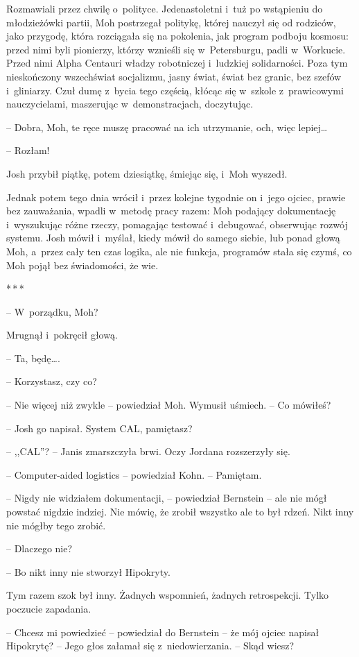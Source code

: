 \documentclass[oneside,polish,11pt,sfheadings]{mwbk}
\newcommand{\threeast}{\bigskip\par\centerline{*\,*\,*}\medskip\par}%
\begin{document}
Rozmawiali przez chwilę o~polityce. Jedenastoletni i~tuż po wstąpieniu do
młodzieżówki partii, Moh postrzegał politykę, której nauczył się od
rodziców, jako przygodę, która rozciągała się na pokolenia, jak program
podboju kosmosu: przed nimi byli pionierzy, którzy wznieśli się w~Petersburgu, padli w~Workucie. Przed nimi Alpha Centauri władzy
robotniczej i~ludzkiej solidarności. Poza tym nieskończony wszechświat
socjalizmu, jasny świat, świat bez granic, bez szefów i~gliniarzy. Czuł
dumę z~bycia tego częścią, kłócąc się w~szkole z~prawicowymi
nauczycielami, maszerując w~demonstracjach, doczytując.

-- Dobra, Moh, te ręce muszę pracować na ich utrzymanie, och, więc
lepiej\ldots

-- Rozłam!

Josh przybił piątkę, potem dziesiątkę, śmiejąc się, i~Moh wyszedł.

Jednak potem tego dnia wrócił i~przez kolejne tygodnie on i~jego ojciec,
prawie bez zauważania, wpadli w~metodę pracy razem: Moh podający
dokumentację i~wyszukując różne rzeczy, pomagając testować i~debugować,
obserwując rozwój systemu. Josh mówił i~myślał, kiedy mówił do samego
siebie, lub ponad głową Moh, a~przez cały ten czas logika, ale nie
funkcja, programów stała się czymś, co Moh pojął bez świadomości, że
wie.
  \threeast 

-- W~porządku, Moh?

Mrugnął i~pokręcił głową. 

-- Ta, będę\ldots.

-- Korzystasz, czy co?

-- Nie więcej niż zwykle -- powiedział Moh. Wymusił uśmiech. -- Co mówiłeś?

-- Josh go napisał. System CAL, pamiętasz?

-- ,,CAL''? -- Janis zmarszczyła brwi. Oczy Jordana rozszerzyły się.

-- Computer-aided logistics -- powiedział Kohn. -- Pamiętam.

-- Nigdy nie widziałem dokumentacji, -- powiedział Bernstein -- ale nie
mógł powstać nigdzie indziej. Nie mówię, że zrobił wszyst\-ko ale to był
rdzeń. Nikt inny nie mógłby tego zrobić.

-- Dlaczego nie?

-- Bo nikt inny nie stworzył Hipokryty.

Tym razem szok był inny. Żadnych wspomnień, żadnych retrospekcji. Tylko
poczucie zapadania.

-- Chcesz mi powiedzieć -- powiedział do Bernstein -- że mój ojciec napisał
Hipokrytę? -- Jego głos załamał się z~niedowierzania. -- Skąd wiesz?
\end{document}
